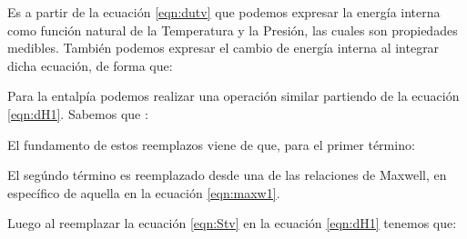 
Es a partir de la ecuación \ref{eqn:dutv} que podemos expresar la energía interna como función natural de la Temperatura y la Presión, las cuales son propiedades medibles. 
También podemos expresar el cambio de energía interna al integrar dicha ecuación, de forma que:


Para la entalpía podemos realizar una operación similar partiendo de la ecuación \ref{eqn:dH1}. Sabemos que :

El fundamento de estos reemplazos viene de que, para el primer término:


El segúndo término es reemplazado desde una de las relaciones de Maxwell, en específico de aquella en la ecuación \ref{eqn:maxw1}.

Luego al reemplazar la ecuación \ref{eqn:Stv} en la ecuación \ref{eqn:dH1} tenemos que:


